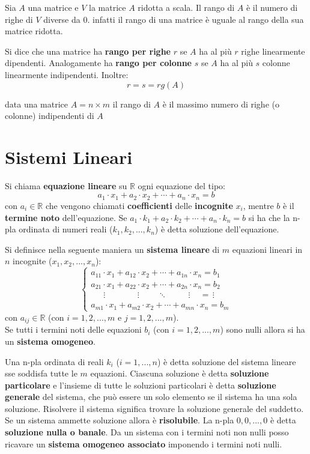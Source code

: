 \documentclass[a4paper,12pt, oneside]{book}
\begin{document}
Sia $A$ una matrice e $V$ la matrice $A$ ridotta a scala. Il rango di $A$ è il numero di righe di $V$ diverse da 0. infatti il rango di una matrice è uguale al rango della sua matrice ridotta.
\begin{definizione}
Si dice che una matrice ha \textbf{rango per righe} $r$ se $A$ ha al più $r$ righe linearmente dipendenti. Analogamente ha \textbf{rango per colonne} $s$ se $A$ ha al più $s$ colonne linearmente indipendenti. Inoltre:
$$r=s=rg(A)$$
\end{definizione}
\begin{teorema}
data una matrice $A=n\times m$ il rango di $A$ è il massimo numero di righe (o colonne) indipendenti di $A$
\end{teorema}
\section{Sistemi Lineari}
\begin{definizione}
Si chiama \textbf{equazione lineare} su $\mathbb{R}$ ogni equazione del tipo:
$$a_1\cdot x_1+a_2\cdot x_2+\cdots +a_n\cdot x_n=b$$
con $a_i\in \mathbb{R}$ che vengono chiamati \textbf{coefficienti} delle \textbf{incognite} $x_i$, mentre $b$ è il \textbf{termine noto} dell'equazione. Se $a_1\cdot k_1+a_2\cdot k_2+\cdots +a_n\cdot k_n=b$ si ha che la n-pla ordinata di numeri reali ($k_1,k_2,...,k_n$) è detta soluzione dell'equazione.  
\end{definizione}
\begin{definizione}
Si definisce nella seguente maniera un \textbf{sistema lineare} di $m$ equazioni lineari in $n$ incognite ($x_1,x_2,...,x_n$):
$$
\begin{cases}
a_{11}\cdot x_1+a_{12}\cdot x_2+\cdots+a_{1n}\cdot x_n=b_1\\
a_{21}\cdot x_1+a_{22}\cdot x_2+\cdots+a_{2n}\cdot x_n=b_2\\
\,\,\,\,\,\,\,\,\,\vdots \,\,\,\,\,\,\,\,\,\,\,\,\,\,\,\,\,\,\,\,\,\,\, \vdots \,\,\,\,\,\,\,\,\,\,\,\,\, \ddots \,\,\,\,\,\,\,\,\,\,\,\,\,\,\, \vdots \,\,\,\,\,\,\,  = \, \vdots\\
a_{m1}\cdot x_1+a_{m2}\cdot x_2+\cdots+a_{mn}\cdot x_n=b_m
\end{cases}$$
con $a_{ij}\in\mathbb{R}$ (con $i=1,2,...,m$ e $ j=1,2,...,m$).\\
Se tutti i termini noti delle equazioni $b_i$ (con $i=1,2,...,m$) sono nulli allora si ha un \textbf{sistema omogeneo}. 
\end{definizione}
Una n-pla ordinata di reali $k_i$ ($i=1,...,n$) è detta soluzione del sistema lineare sse soddisfa tutte le $m$ equazioni. Ciascuna soluzione è detta \textbf{soluzione particolare} e l'insieme di tutte le soluzioni particolari è detta \textbf{soluzione generale} del sistema, che può essere un solo elemento se il sistema ha una sola soluzione. Risolvere il sistema significa trovare la soluzione generale del suddetto. Se un sistema ammette soluzione allora è \textbf{risolubile}. La n-pla $0,0,...,0$ è detta \textbf{soluzione nulla o banale}. Da un sistema con i termini noti non nulli posso ricavare un \textbf{sistema omogeneo associato} imponendo i termini noti nulli. 
\end{document}
